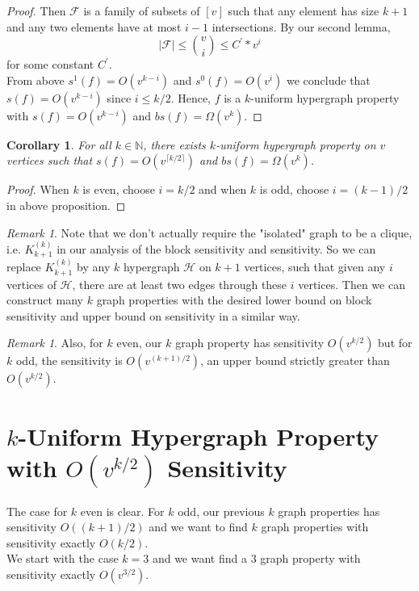 \documentclass[psamsfonts]{amsart}
\newtheorem{cor}[theorem]{Corollary}
\theoremstyle{definition}
\theoremstyle{remark}
\newtheorem{rem}[theorem]{Remark}
\numberwithin{equation}{section}
\begin{document}
\begin{proof}
		\indent Then $\mathcal{F}$ is a family of subsets of $[v]$ such that any element has size $k+1$ and any two elements have at most $i-1$ intersections. By our second lemma,
		\begin{equation}
			|\mathcal{F}| \leq {v \choose{i}} \leq C^{\prime} * v^i \nonumber
		\end{equation}
		for some constant $C^\prime$.\\
		\indent From above $s^1(f) = O(v^{k-i})$ and $s^0(f) = O(v^{i})$ we conclude that $s(f) = O(v^{k-i})$ since $i \leq k/2$. Hence, $f$ is a $k$-uniform hypergraph property with $s(f)=O(v^{k-i})$ and $bs(f) = \Omega(v^{k})$.
	\end{proof}
	
	\begin{cor}
		For all $k \in \mathbb{N}$, there exists $k$-uniform hypergraph property on $v$ vertices such that $s(f) = O(v^{\lceil k/2 \rceil})$ and $bs(f)= \Omega (v^k)$.
	\end{cor}
	\begin{proof}
		When $k$ is even, choose $i=k/2$ and when $k$ is odd, choose $i=(k-1)/2$ in above proposition.
	\end{proof}
	
	\begin{rem}
		Note that we don't actually require the "isolated" graph to be a clique, i.e. $K_{k+1}^{(k)}$ in our analysis of the block sensitivity and sensitivity. So we can replace $K_{k+1}^{(k)}$ by any $k$ hypergraph $\mathcal{H}$ on $k+1$ vertices, such that given any $i$ vertices of $\mathcal{H}$, there are at least two edges through these $i$ vertices. Then we can construct many $k$ graph properties with the desired lower bound on block sensitivity and upper bound on sensitivity in a similar way.
	\end{rem}
	
	\begin{rem}
		Also, for $k$ even, our $k$ graph property has sensitivity $O(v^{k/2})$ but for $k$ odd, the sensitivity is $O(v^{(k+1)/2})$, an upper bound strictly greater than $O(v^{k/2})$.
	\end{rem}
	
	\section{$k$-Uniform  Hypergraph Property with $O(v^{k/2})$ Sensitivity}
	The case for $k$ even is clear. For $k$ odd, our previous $k$ graph properties has sensitivity  $O((k+1)/2)$ and we want to find $k$ graph properties with sensitivity exactly $O(k/2)$.\\
	\indent We start with the case $k=3$ and we want find a $3$ graph property with sensitivity exactly $O(v^{3/2})$.
	
\end{document}
